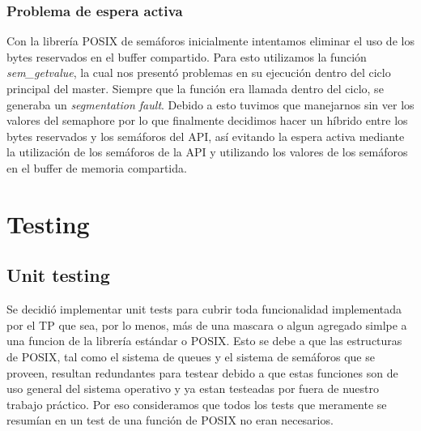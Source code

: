 \documentclass[10pt,a4paper]{report}
\begin{document}
\subsection{Problema de espera activa}
	Con la librería POSIX de semáforos inicialmente intentamos eliminar el uso de los bytes reservados en el buffer compartido. Para esto utilizamos la función \textit{sem\_getvalue}, la cual nos presentó problemas en su ejecución dentro del ciclo principal del master. Siempre que la función era llamada dentro del ciclo, se generaba un \textit{segmentation fault}. Debido a esto tuvimos que manejarnos sin ver los valores del semaphore por lo que finalmente decidimos hacer un híbrido entre los bytes reservados y los semáforos del API, así evitando la espera activa mediante la utilización de los semáforos de la API y utilizando los valores de los semáforos en el buffer de memoria compartida.


\chapter{Testing}
\section{Unit testing}
Se decidió implementar unit tests para cubrir toda funcionalidad implementada por el TP que sea, por lo menos, más de una mascara o algun agregado simlpe a una funcion de la librería estándar o POSIX. 
Esto se debe a que las estructuras de POSIX, tal como el sistema de queues y el sistema de semáforos que se proveen, resultan redundantes para testear debido a que estas funciones son de uso general del sistema operativo y ya estan testeadas por fuera de nuestro trabajo práctico. Por eso consideramos que todos los tests que meramente se resumían en un test de una función de POSIX no eran necesarios.
\end{document}
